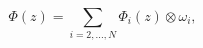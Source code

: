 \begin{equation}\label{globrazl}
\Phi(z)=\sum_{i=2,...,N} \Phi_i(z) \otimes \omega_i,
\end{equation}

